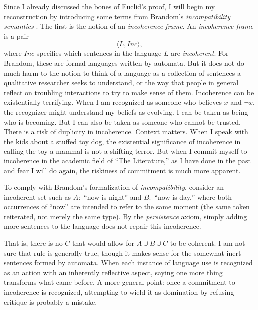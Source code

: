 \documentclass[12pt]{book}
\begin{document}
Since I already discussed the bones of Euclid's proof, I will begin my reconstruction by introducing some terms from Brandom's \textit{incompatibility semantics} \parencite{Brandom2008}. The first is the notion of an \textit{incoherence frame}. An \textit{incoherence frame} is a pair 
\[
\langle L, Inc \rangle,
\]
where $Inc$ specifies which sentences in the language $L$ are \textit{incoherent}. For Brandom, these are formal languages written by automata. But it does not do much harm to the notion to think of a language as a collection of sentences a qualitative researcher seeks to understand, or the way that people in general reflect on troubling interactions to try to make sense of them. Incoherence can be existentially terrifying. When I am recognized as someone who believes $x$ and $\neg x$, the recognizer might understand my beliefs as evolving.  I can be taken as being who is becoming. But I can also be taken as someone who cannot be trusted. There is a risk of duplicity in incoherence. Context matters. When I speak with the kids about a stuffed toy dog, the existential significance of incoherence in calling the toy a mammal is not a shifting terror. But when I commit myself to incoherence in the academic field of ``The Literature,'' as I have done in the past and fear I will do again, the riskiness of commitment is much more apparent. 

To comply with Brandom's formalization of \textit{incompatibility}, consider an incoherent set such as $A:$ ``now is night'' and $B:$ ``now is day,'' where both occurrences of ``now'' are intended to refer to the same moment (the same token reiterated, not merely the same type). By the \textit{persistence} axiom, simply adding more sentences to the language does not repair this incoherence.

That is, there is no $C$ that would allow for $A\cup B \cup C$ to be coherent. I am not sure that rule is generally true, though it makes sense for the somewhat inert sentences formed by automata. When each instance of language use is recognized as an action with an inherently reflective aspect, saying one more thing transforms what came before.
A more general point: once a commitment to incoherence is recognized, attempting to wield it as domination by refusing critique is probably a mistake.
\end{document}
